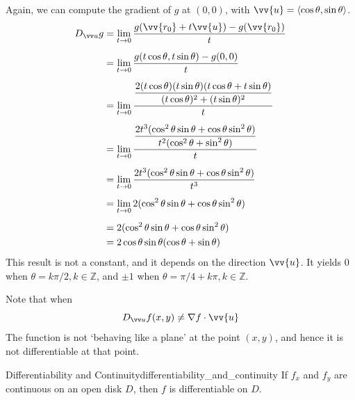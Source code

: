 Again, we can compute the gradient of $g$ at $(0, 0)$, with $\vv{u} = \ang{\cos\theta, \sin\theta}$.
\begin{align*}
    \direcd{u}{g} &= \lim_{t \to 0} \frac{g(\vv{r_0} + t\vv{u}) - g(\vv{r_0})}{t} \\[0.5em]
    &= \lim_{t \to 0} \frac{g(t\cos\theta, t\sin\theta) - g(0, 0)}{t} \\[0.5em]
    &= \lim_{t \to 0} \frac{\dfrac{2(t\cos\theta)(t\sin\theta)(t\cos\theta+t\sin\theta)}{(t\cos\theta)^2+(t\sin\theta)^2}}{t} \\[0.5em]
    &= \lim_{t \to 0} \frac{\dfrac{2t^3(\cos^2\theta\sin\theta+\cos\theta\sin^2\theta)}{t^2(\cos^2\theta+\sin^2\theta)}}{t} \\[0.5em]
    &= \lim_{t \to 0} \frac{2t^3(\cos^2\theta\sin\theta+\cos\theta\sin^2\theta)}{t^3} \\[0.5em]
    &= \lim_{t \to 0} 2(\cos^2\theta\sin\theta+\cos\theta\sin^2\theta) \\[0.5em]
    &= 2(\cos^2\theta\sin\theta+\cos\theta\sin^2\theta) \\
    &= 2\cos\theta\sin\theta(\cos\theta+\sin\theta)
\end{align*}
This result is not a constant, and it depends on the direction $\vv{u}$.
It yields $0$ when $\theta = k\pi/2, k \in \mathbb{Z}$, and $\pm 1$ when $\theta = \pi/4 + k\pi, k \in \mathbb{Z}$.

Note that when
\[
    \direcd{u}{f}(x, y) \neq \nabla f \cdot \vv{u}
\]
The function is not `behaving like a plane' at the point $(x, y)$, and hence it is not differentiable at that point.

\begin{theorem}{Differentiability and Continuity}{differentiability_and_continuity}
If $f_x$ and $f_y$ are continuous on an open disk $D$, then $f$ is differentiable on $D$.
\end{theorem}

